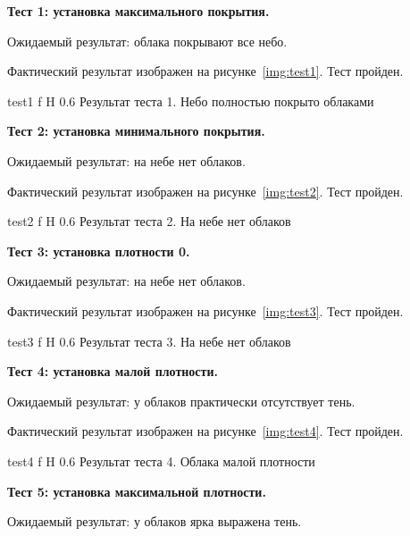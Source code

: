 \textbf{Тест 1: установка максимального покрытия.}

Ожидаемый результат: облака покрывают все небо.

Фактический результат изображен на рисунке~\ref{img:test1}. Тест пройден.

{test1} %
{f} %
{H} %
{0.6\textwidth} %
{Результат теста 1. Небо полностью покрыто облаками} %


\textbf{Тест 2: установка минимального покрытия.}

Ожидаемый результат: на небе нет облаков.

Фактический результат изображен на рисунке~\ref{img:test2}. Тест пройден.

{test2} %
{f} %
{H} %
{0.6\textwidth} %
{Результат теста 2. На небе нет облаков} %


\textbf{Тест 3: установка плотности 0.}

Ожидаемый результат: на небе нет облаков.

Фактический результат изображен на рисунке~\ref{img:test3}. Тест пройден.

{test3} %
{f} %
{H} %
{0.6\textwidth} %
{Результат теста 3. На небе нет облаков} %



\textbf{Тест 4: установка малой плотности.}

Ожидаемый результат: у облаков практически отсутствует тень.

Фактический результат изображен на рисунке~\ref{img:test4}. Тест пройден.

{test4} %
{f} %
{H} %
{0.6\textwidth} %
{Результат теста 4. Облака малой плотности} %


\textbf{Тест 5: установка максимальной плотности.}

Ожидаемый результат: у облаков ярка выражена тень.

